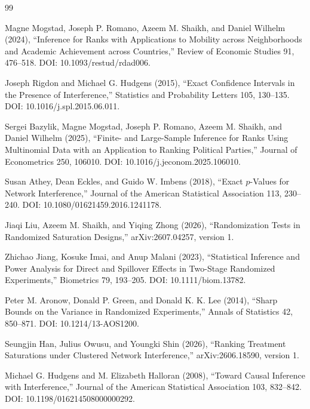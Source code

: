 \documentclass{article}
\begin{document}
\begin{thebibliography}{99}

   Magne Mogstad, Joseph P. Romano, Azeem M. Shaikh, and Daniel Wilhelm (2024), ``Inference for Ranks with Applications to Mobility across Neighborhoods and Academic Achievement across Countries,'' Review of Economic Studies 91, 476--518. DOI: 10.1093/restud/rdad006.

   Joseph Rigdon and Michael G. Hudgens (2015), ``Exact Confidence Intervals in the Presence of Interference,'' Statistics and Probability Letters 105, 130--135. DOI: 10.1016/j.spl.2015.06.011.

   Sergei Bazylik, Magne Mogstad, Joseph P. Romano, Azeem M. Shaikh, and Daniel Wilhelm (2025), ``Finite- and Large-Sample Inference for Ranks Using Multinomial Data with an Application to Ranking Political Parties,'' Journal of Econometrics 250, 106010. DOI: 10.1016/j.jeconom.2025.106010.

   Susan Athey, Dean Eckles, and Guido W. Imbens (2018), ``Exact \(p\)-Values for Network Interference,'' Journal of the American Statistical Association 113, 230--240. DOI: 10.1080/01621459.2016.1241178.

   Jiaqi Liu, Azeem M. Shaikh, and Yiqing Zhong (2026), ``Randomization Tests in Randomized Saturation Designs,'' arXiv:2607.04257, version 1.

   Zhichao Jiang, Kosuke Imai, and Anup Malani (2023), ``Statistical Inference and Power Analysis for Direct and Spillover Effects in Two-Stage Randomized Experiments,'' Biometrics 79, 193--205. DOI: 10.1111/biom.13782.

   Peter M. Aronow, Donald P. Green, and Donald K. K. Lee (2014), ``Sharp Bounds on the Variance in Randomized Experiments,'' Annals of Statistics 42, 850--871. DOI: 10.1214/13-AOS1200.

   Seungjin Han, Julius Owusu, and Youngki Shin (2026), ``Ranking Treatment Saturations under Clustered Network Interference,'' arXiv:2606.18590, version 1.

   Michael G. Hudgens and M. Elizabeth Halloran (2008), ``Toward Causal Inference with Interference,'' Journal of the American Statistical Association 103, 832--842. DOI: 10.1198/016214508000000292.

\end{thebibliography}
\end{document}
